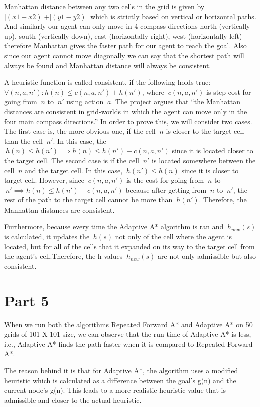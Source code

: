\documentclass{article}
\begin{document}
Manhattan distance between any two cells in the grid is given by ${|(x1 - x2)}| + |{(y1 - y2)|}$ which is strictly based on vertical or horizontal paths. And similarly our agent can only move in 4 compass directions north (vertically up), south (vertically down), east (horizontally right), west (horizontally left) therefore Manhattan gives the faster path for our agent to reach the goal. Also since our agent cannot move diagonally we can say that the shortest path will always be found and Manhattan distance will always be consistent.

A heuristic function is called consistent, if the following holds true: $\forall (n,a,n'): h (n)\leq c(n,a,n')+h(n')$, where $\ c(n,a,n')$ is step cost for going from $\ n$ to $\ n'$ using action $\ a$. The project argues that “the Manhattan distances are consistent in grid-worlds in which the agent can move only in the four main compass directions.” In order to prove this, we will consider two cases. The first case is, the more obvious one, if the cell $\ n$ is closer to the target cell than the cell $\ n'$. In this case, the $\ h(n) \leq h(n') \implies h(n) \leq h(n')+c(n,a,n')$ since it is located closer to the target cell. The second case is if the cell $\ n'$ is located somewhere between the cell $\ n$ and the target cell. In this case, $\ h(n') \leq h(n)$ since it is closer to target cell. However, since $\ c(n,a,n')$ is the cost for going from $\ n$ to $\ n' \implies h(n) \leq h(n')+c(n,a,n')$ because after getting from $\ n$ to $\ n'$, the rest of the path to the target cell cannot be more than $\ h(n')$. Therefore, the Manhattan distances are consistent.

Furthermore, because every time the Adaptive A* algorithm is ran and $\ h_{new}(s)$ is calculated, it updates the $\ h(s)$ not only of the cell where the agent is located, but for all of the cells that it expanded on its way to the target cell from the agent's cell.Therefore, the h-values $\ h_{new}(s)$ are not only admissible but also consistent.

\section*{Part 5}

When we run both the algorithms Repeated Forward A* and Adaptive A* on 50 grids of 101 X 101 size, we can observe that the run-time of Adaptive A* is less, i.e., Adaptive A* finds the path faster when it is compared to Repeated Forward A*.

The reason behind it is that for Adaptive A*, the algorithm uses a modified heuristic which is calculated as a difference between the goal’s g(n) and the current node’s g(n). This leads to a more realistic heuristic value that is admissible and closer to the actual heuristic. 
\end{document}
